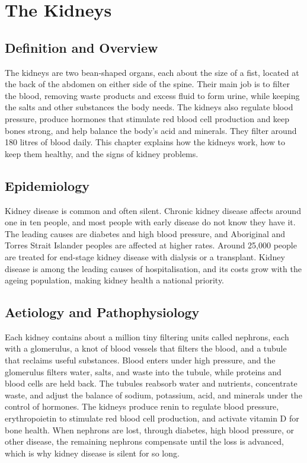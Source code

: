 \chapter{The Kidneys}

\section*{Definition and Overview}
The kidneys are two bean-shaped organs, each about the size of a fist, located at the back of the abdomen on either side of the spine. Their main job is to filter the blood, removing waste products and excess fluid to form urine, while keeping the salts and other substances the body needs. The kidneys also regulate blood pressure, produce hormones that stimulate red blood cell production and keep bones strong, and help balance the body's acid and minerals. They filter around 180 litres of blood daily. This chapter explains how the kidneys work, how to keep them healthy, and the signs of kidney problems.

\section*{Epidemiology}
Kidney disease is common and often silent. Chronic kidney disease affects around one in ten people, and most people with early disease do not know they have it. The leading causes are diabetes and high blood pressure, and Aboriginal and Torres Strait Islander peoples are affected at higher rates. Around 25,000 people are treated for end-stage kidney disease with dialysis or a transplant. Kidney disease is among the leading causes of hospitalisation, and its costs grow with the ageing population, making kidney health a national priority.

\section*{Aetiology and Pathophysiology}
Each kidney contains about a million tiny filtering units called nephrons, each with a glomerulus, a knot of blood vessels that filters the blood, and a tubule that reclaims useful substances. Blood enters under high pressure, and the glomerulus filters water, salts, and waste into the tubule, while proteins and blood cells are held back. The tubules reabsorb water and nutrients, concentrate waste, and adjust the balance of sodium, potassium, acid, and minerals under the control of hormones. The kidneys produce renin to regulate blood pressure, erythropoietin to stimulate red blood cell production, and activate vitamin D for bone health. When nephrons are lost, through diabetes, high blood pressure, or other disease, the remaining nephrons compensate until the loss is advanced, which is why kidney disease is silent for so long.

